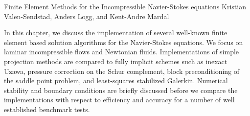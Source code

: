               {Finite Element Methods for the Incompressible Navier-Stokes equations}
              {Kristian Valen-Sendstad, Anders Logg, and Kent-Andre Mardal}

\editornote{[kvs-1]}

In this chapter, we discuss the implementation of several well-known
finite element based solution algorithms for the Navier-Stokes
equations. We focus on laminar incompressible flows and Newtonian
fluids. Implementations of simple projection methods are compared to
fully implicit schemes such as inexact Uzawa, pressure correction on
the Schur complement, block preconditioning of the saddle point
problem, and least-squares stabilized Galerkin. Numerical stability
and boundary conditions are briefly discussed before we compare the
implementations with respect to efficiency and accuracy for a number
of well established benchmark tests.
